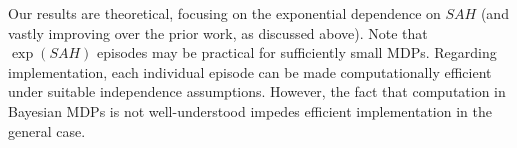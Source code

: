 
Our results are theoretical, focusing on the exponential dependence on $SAH$ (and vastly improving over the prior work, as discussed above). Note that $\exp(SAH)$ episodes may be practical for sufficiently small MDPs.
Regarding implementation, each individual episode can be made computationally efficient under suitable independence assumptions. However, the fact that computation in Bayesian MDPs is not well-understood impedes efficient implementation in the general case.
